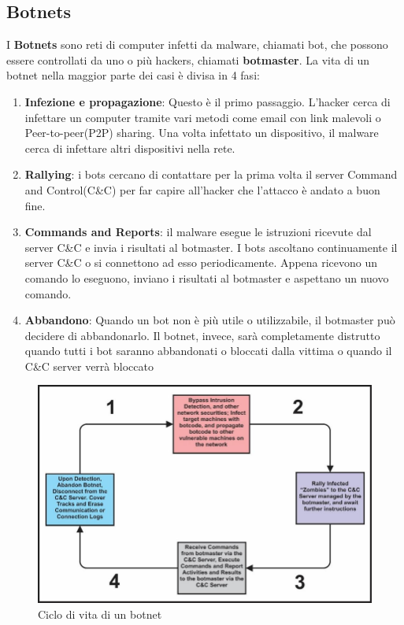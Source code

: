 \documentclass[12pt,a4paper,openright,twoside]{book}
\begin{document}
\subsection{Botnets}

I \textbf{Botnets} sono reti di computer infetti da malware, chiamati bot,
che possono essere controllati da uno o più hackers, chiamati \textbf{botmaster}.
La vita di un botnet nella maggior parte dei casi è divisa in 4 fasi:
\begin{enumerate}
    \item \textbf{Infezione e propagazione}: Questo è il primo
    passaggio. L'hacker cerca di infettare un computer
    tramite vari metodi come email con link malevoli o Peer-to-peer(P2P) sharing.
    Una volta infettato un dispositivo, il malware cerca di infettare
    altri dispositivi nella rete.

    \item \textbf{Rallying}: i bots cercano di contattare per la prima volta
    il server Command and Control(C\&C) per far capire all'hacker
    che l'attacco è andato a buon fine.

    \item \textbf{Commands and Reports}: il malware esegue le istruzioni
    ricevute dal server C\&C e invia i risultati al botmaster.
    I bots ascoltano continuamente il server C\&C 
    o si connettono ad esso periodicamente. Appena ricevono
    un comando lo eseguono, inviano i risultati al botmaster
    e aspettano un nuovo comando.

    \item \textbf{Abbandono}: Quando un bot non è più utile o utilizzabile,
    il botmaster può decidere di abbandonarlo. Il botnet, invece,
    sarà completamente distrutto quando tutti i bot saranno
    abbandonati o bloccati dalla vittima o quando il C\&C server
    verrà bloccato


\end{enumerate}

\begin{figure}[H]
    \centering
    \includegraphics[width=.8\linewidth]{figures/The-Lifecycle-Schema-of-a-typical-Botnet.png}
    \caption{Ciclo di vita di un botnet \cite{Ogu2016}}
    \label{fig:botnet}
\end{figure}
\end{document}
